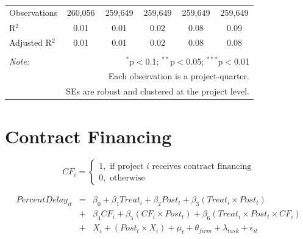 \documentclass[
]{article}
\begin{document}
\begin{table}[H]
\begin{tabular}{@{\extracolsep{-2pt}}lccccc}
Observations & 260,056 & 259,649 & 259,649 & 259,649 & 259,649 \\ 
R$^{2}$ & 0.01 & 0.01 & 0.02 & 0.08 & 0.09 \\ 
Adjusted R$^{2}$ & 0.01 & 0.01 & 0.02 & 0.08 & 0.08 \\ 
\hline 
\hline \\[-1.8ex] 
\textit{Note:}  & \multicolumn{5}{r}{$^{*}$p$<$0.1; $^{**}$p$<$0.05; $^{***}$p$<$0.01} \\ 
 & \multicolumn{5}{r}{Each observation is a project-quarter.} \\ 
 & \multicolumn{5}{r}{SEs are robust and clustered at the project level.} \\ 
\end{tabular} 
\end{table}

\hypertarget{contract-financing}{%
\section{Contract Financing}\label{contract-financing}}

\[ CF_i = \begin{cases} 1, \text{ if project } i \text{ receives contract financing}\\
0, \text{ otherwise} \end{cases}\]

\[ \begin{aligned}
PercentDelay_{it} &=& \beta_0+\beta_1 Treat_i + \beta_2 Post_t + \beta_3 (Treat_i \times Post_t) \\
&+&\beta_4 CF_i + \beta_5 (CF_i \times Post_t) + \beta_6 (Treat_i \times Post_t \times CF_i) \\ 
&+&X_i + (Post_t \times X_i) + \mu_t + \theta_{firm} + \lambda_{task}+ \epsilon_{it}
\end{aligned}\]
\end{document}
